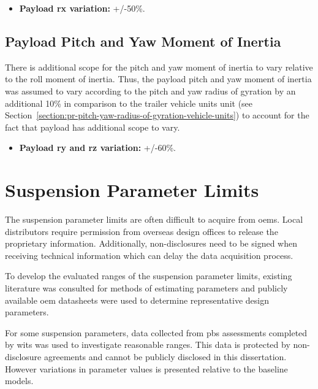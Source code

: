 \begin{itemize}
\item \textbf{Payload \gls{rx} variation:} +/-50\%.
\end{itemize}

\subsection{Payload Pitch and Yaw Moment of Inertia}\label{section:pr-pitch-yaw-radius-of-gyration-payload}

There is additional scope for the pitch and yaw moment of inertia to vary relative to the roll moment of inertia. Thus, the payload pitch and yaw moment of inertia was assumed to vary according to the pitch and yaw radius of gyration by an additional 10\% in comparison to the trailer vehicle units unit (see Section~\ref{section:pr-pitch-yaw-radius-of-gyration-vehicle-units}) to account for the fact that payload has additional scope to vary.

\begin{itemize}
\item \textbf{Payload \gls{ry} and \gls{rz} variation:} +/-60\%.
\end{itemize}

\section{Suspension Parameter Limits}\label{section:pr-suspension-parameter-limits}

The suspension parameter limits are often difficult to acquire from \glspl{oem}. Local distributors require permission from overseas design offices to release the proprietary information. Additionally, non-disclosures need to be signed when receiving technical information which can delay the data acquisition process.

To develop the evaluated ranges of the suspension parameter limits, existing literature was consulted for methods of estimating parameters and publicly available \gls{oem} datasheets were used to determine representative design parameters.

For some suspension parameters, data collected from \gls{pbs} assessments completed by \gls{wits} was used to investigate reasonable ranges. This data is protected by non-disclosure agreements and cannot be publicly disclosed in this dissertation. However variations in parameter values is presented relative to the baseline models.

